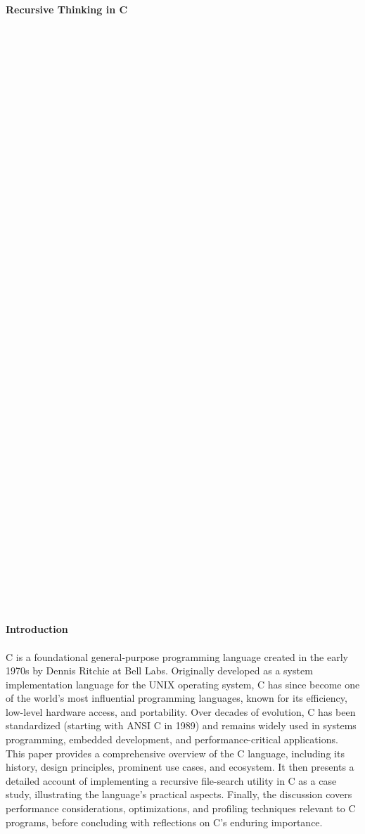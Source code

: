 \documentclass{article}
\begin{document}
\\
{\huge \textbf{Recursive Thinking in C}}\\
\\
\\
\\
\\
\\
\\
\\
\\
\\
\\
\\
\\
\\
\\
\\
\\
\\
\\
\\
\\
\\
\\
\\
\\
\\
\\
\\
\\
\\
\\
\\
\\
\\
\\
\\
\\
\\
\\
\\
\\
\\
\\
\\
\\
{\Large \textbf{Introduction}}\\
\\
{\normalsize C is a foundational general-purpose programming language created in the early 1970s by Dennis Ritchie at Bell Labs. Originally developed as a system implementation language for the UNIX operating system, C has since become one of the world's }{\normalsize most influential programming languages, known for its efficiency, low-level hardware access, and portability. Over decades of evolution, C has been standardized (starting with ANSI C in 1989) and remains widely used in systems programming, embedded develop}{\normalsize ment, and performance-critical applications. This paper provides a comprehensive overview of the C language, including its history, design principles, prominent use cases, and ecosystem. It then presents a detailed account of implementing a recursive file-}{\normalsize search utility in C as a case study, illustrating the language's practical aspects. Finally, the discussion covers performance considerations, optimizations, and profiling techniques relevant to C programs, before concluding with reflections on C's endurin}{\normalsize g importance.}\\
\end{document}

